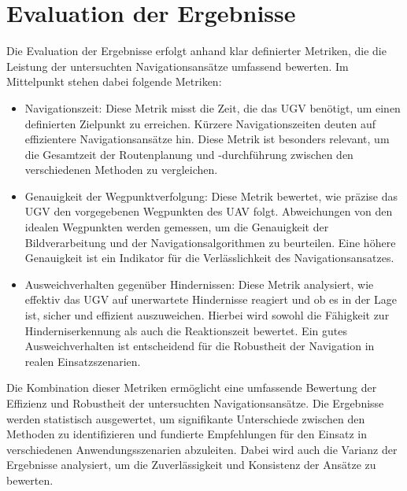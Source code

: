 \section{Evaluation der Ergebnisse}

Die Evaluation der Ergebnisse erfolgt anhand klar definierter Metriken, die die Leistung der untersuchten Navigationsansätze umfassend bewerten. 
Im Mittelpunkt stehen dabei folgende Metriken:

\begin{itemize}
    \item Navigationszeit: Diese Metrik misst die Zeit, die das \ac{UGV} benötigt, um einen definierten Zielpunkt zu erreichen. Kürzere Navigationszeiten deuten auf effizientere Navigationsansätze hin. Diese Metrik ist besonders relevant, um die Gesamtzeit der Routenplanung und -durchführung zwischen den verschiedenen Methoden zu vergleichen.
    
    \item Genauigkeit der Wegpunktverfolgung: Diese Metrik bewertet, wie präzise das \ac{UGV} den vorgegebenen Wegpunkten des \ac{UAV} folgt. Abweichungen von den idealen Wegpunkten werden gemessen, um die Genauigkeit der Bildverarbeitung und der Navigationsalgorithmen zu beurteilen. Eine höhere Genauigkeit ist ein Indikator für die Verlässlichkeit des Navigationsansatzes.
    
    \item Ausweichverhalten gegenüber Hindernissen: Diese Metrik analysiert, wie effektiv das \ac{UGV} auf unerwartete Hindernisse reagiert und ob es in der Lage ist, sicher und effizient auszuweichen. Hierbei wird sowohl die Fähigkeit zur Hinderniserkennung als auch die Reaktionszeit bewertet. Ein gutes Ausweichverhalten ist entscheidend für die Robustheit der Navigation in realen Einsatzszenarien.
\end{itemize}

Die Kombination dieser Metriken ermöglicht eine umfassende Bewertung der Effizienz und Robustheit der untersuchten Navigationsansätze. 
Die Ergebnisse werden statistisch ausgewertet, um signifikante Unterschiede zwischen den Methoden zu identifizieren und fundierte Empfehlungen für den Einsatz in verschiedenen Anwendungsszenarien abzuleiten. 
Dabei wird auch die Varianz der Ergebnisse analysiert, um die Zuverlässigkeit und Konsistenz der Ansätze zu bewerten.
